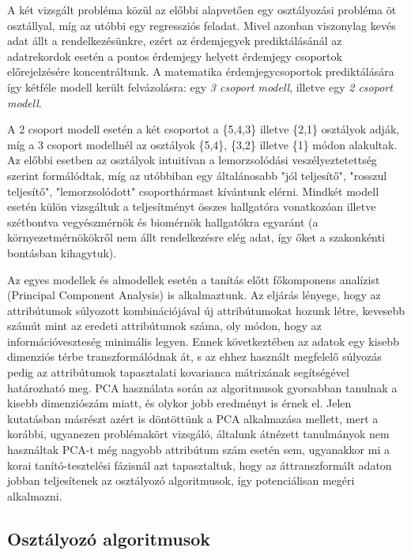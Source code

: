 \documentclass[12pt]{article}
\begin{document}
A két vizsgált probléma közül az előbbi alapvetően egy osztályozási probléma öt osztállyal, míg az utóbbi egy regressziós feladat. Mivel azonban viszonylag kevés adat állt a rendelkezésünkre, ezért az érdemjegyek prediktálásánál az adatrekordok esetén a pontos érdemjegy helyett érdemjegy csoportok előrejelzésére koncentráltunk. A matematika érdemjegycsoportok prediktálására így kétféle modell került felvázolásra: egy \textit{3 csoport modell}, illetve egy \textit{2 csoport modell}.

A 2 csoport modell esetén a két csoportot a \{5,4,3\} illetve \{2,1\} osztályok adják, míg a 3 csoport modellnél az osztályok \{5,4\}, \{3,2\} illetve \{1\} módon alakultak. Az előbbi esetben az osztályok intuitívan a lemorzsolódási veszélyeztetettség szerint formálódtak, míg az utóbbiban egy általánosabb "jól teljesítő", "rosszul teljesítő", "lemorzsolódott" csoporthármast kívántunk elérni. Mindkét modell esetén külön vizsgáltuk a teljesítményt összes hallgatóra vonatkozóan illetve szétbontva vegyészmérnök és biomérnök hallgatókra egyaránt (a környezetmérnökökről nem állt rendelkezésre elég adat, így őket a szakonkénti bontásban kihagytuk).

Az egyes modellek és almodellek esetén a tanítás előtt főkomponens analízist (Principal Component Analysis) is alkalmaztunk. Az eljárás lényege, hogy az attribútumok súlyozott kombinációjával új attribútumokat hozunk létre, kevesebb számút mint az eredeti attribútumok száma, oly módon, hogy az információveszteség minimális legyen. Ennek következtében az adatok egy kisebb dimenziós térbe transzformálódnak át, s az ehhez használt megfelelő súlyozás pedig az attribútumok tapasztalati kovarianca mátrixának segítségével határozható meg. PCA használata során az algoritmusok gyorsabban tanulnak a kisebb dimenziószám miatt, és olykor jobb eredményt is érnek el. Jelen kutatásban másrészt azért is döntöttünk a PCA alkalmazása mellett, mert a korábbi, ugyanezen problémakört vizsgáló, általunk átnézett tanulmányok nem használtak PCA-t még nagyobb attribútum szám esetén sem, ugyanakkor mi a korai tanító-tesztelési fázisnál azt tapasztaltuk, hogy az áttranszformált adaton jobban teljesítenek az osztályozó algoritmusok, így potenciálisan megéri alkalmazni.



\subsection{Osztályozó algoritmusok}

%
\end{document}
